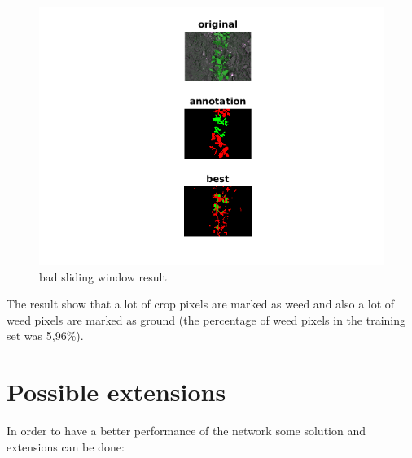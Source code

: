 \documentclass[]{report}
\begin{document}
\begin{figure}[h]
	\begin{center}
		\includegraphics[scale=0.62]{15.png}
		\caption{bad sliding window result}
		\label{fig:bad sliding window result}
	\end{center}
\end{figure}
\newpage

The result show that a lot of crop pixels are marked as weed and also a lot of weed pixels are marked as ground (the percentage of weed pixels in the training set was 5,96\%).

\section{Possible extensions}

In order to have a better performance of the network some solution and extensions can be done:
\end{document}
